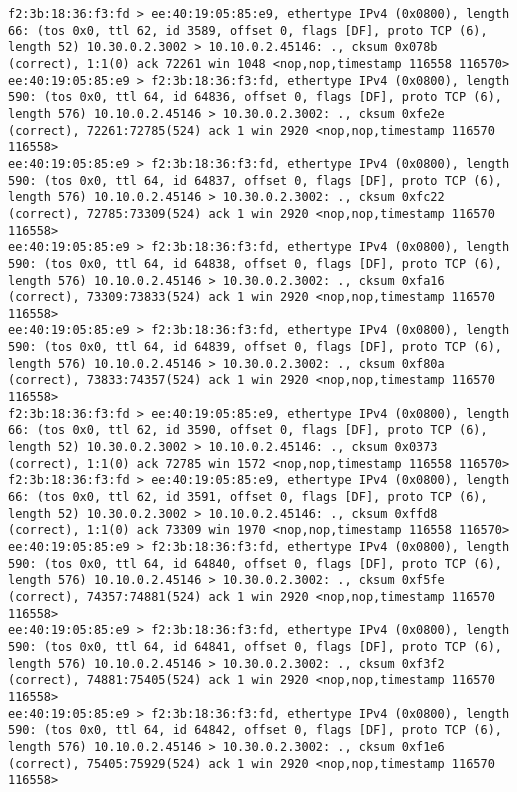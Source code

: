 \documentclass[a4paper,12pt]{article}
\begin{document}
\begin{Verbatim}
f2:3b:18:36:f3:fd > ee:40:19:05:85:e9, ethertype IPv4 (0x0800), length 66: (tos 0x0, ttl 62, id 3589, offset 0, flags [DF], proto TCP (6), length 52) 10.30.0.2.3002 > 10.10.0.2.45146: ., cksum 0x078b (correct), 1:1(0) ack 72261 win 1048 <nop,nop,timestamp 116558 116570>
ee:40:19:05:85:e9 > f2:3b:18:36:f3:fd, ethertype IPv4 (0x0800), length 590: (tos 0x0, ttl 64, id 64836, offset 0, flags [DF], proto TCP (6), length 576) 10.10.0.2.45146 > 10.30.0.2.3002: ., cksum 0xfe2e (correct), 72261:72785(524) ack 1 win 2920 <nop,nop,timestamp 116570 116558>
ee:40:19:05:85:e9 > f2:3b:18:36:f3:fd, ethertype IPv4 (0x0800), length 590: (tos 0x0, ttl 64, id 64837, offset 0, flags [DF], proto TCP (6), length 576) 10.10.0.2.45146 > 10.30.0.2.3002: ., cksum 0xfc22 (correct), 72785:73309(524) ack 1 win 2920 <nop,nop,timestamp 116570 116558>
ee:40:19:05:85:e9 > f2:3b:18:36:f3:fd, ethertype IPv4 (0x0800), length 590: (tos 0x0, ttl 64, id 64838, offset 0, flags [DF], proto TCP (6), length 576) 10.10.0.2.45146 > 10.30.0.2.3002: ., cksum 0xfa16 (correct), 73309:73833(524) ack 1 win 2920 <nop,nop,timestamp 116570 116558>
ee:40:19:05:85:e9 > f2:3b:18:36:f3:fd, ethertype IPv4 (0x0800), length 590: (tos 0x0, ttl 64, id 64839, offset 0, flags [DF], proto TCP (6), length 576) 10.10.0.2.45146 > 10.30.0.2.3002: ., cksum 0xf80a (correct), 73833:74357(524) ack 1 win 2920 <nop,nop,timestamp 116570 116558>
f2:3b:18:36:f3:fd > ee:40:19:05:85:e9, ethertype IPv4 (0x0800), length 66: (tos 0x0, ttl 62, id 3590, offset 0, flags [DF], proto TCP (6), length 52) 10.30.0.2.3002 > 10.10.0.2.45146: ., cksum 0x0373 (correct), 1:1(0) ack 72785 win 1572 <nop,nop,timestamp 116558 116570>
f2:3b:18:36:f3:fd > ee:40:19:05:85:e9, ethertype IPv4 (0x0800), length 66: (tos 0x0, ttl 62, id 3591, offset 0, flags [DF], proto TCP (6), length 52) 10.30.0.2.3002 > 10.10.0.2.45146: ., cksum 0xffd8 (correct), 1:1(0) ack 73309 win 1970 <nop,nop,timestamp 116558 116570>
ee:40:19:05:85:e9 > f2:3b:18:36:f3:fd, ethertype IPv4 (0x0800), length 590: (tos 0x0, ttl 64, id 64840, offset 0, flags [DF], proto TCP (6), length 576) 10.10.0.2.45146 > 10.30.0.2.3002: ., cksum 0xf5fe (correct), 74357:74881(524) ack 1 win 2920 <nop,nop,timestamp 116570 116558>
ee:40:19:05:85:e9 > f2:3b:18:36:f3:fd, ethertype IPv4 (0x0800), length 590: (tos 0x0, ttl 64, id 64841, offset 0, flags [DF], proto TCP (6), length 576) 10.10.0.2.45146 > 10.30.0.2.3002: ., cksum 0xf3f2 (correct), 74881:75405(524) ack 1 win 2920 <nop,nop,timestamp 116570 116558>
ee:40:19:05:85:e9 > f2:3b:18:36:f3:fd, ethertype IPv4 (0x0800), length 590: (tos 0x0, ttl 64, id 64842, offset 0, flags [DF], proto TCP (6), length 576) 10.10.0.2.45146 > 10.30.0.2.3002: ., cksum 0xf1e6 (correct), 75405:75929(524) ack 1 win 2920 <nop,nop,timestamp 116570 116558>

\end{Verbatim}
\end{document}
